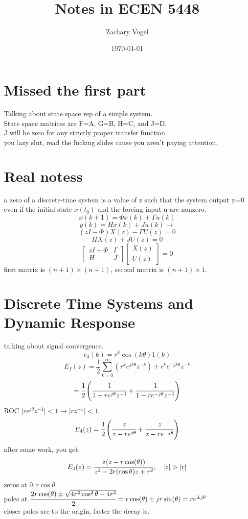 \documentclass{article}
\author{Zachary Vogel}
\date{\today}
\title{Notes in ECEN 5448}
\begin{document}
\maketitle


\section*{Missed the first part}
Talking about state space rep of a simple system.\\
State space matrices are F=A, G=B, H=C, and J=D.\\
J will be zero for any strictly proper transfer function.\\

you lazy slut, read the fucking slides cause you aren't paying attention.\\

\section*{Real notess}
a zero of a discrete-time system is a value of z such that the system output y=0 even if the initial state $x(t_0)$ and the forcing input u are nonzero.\\
\[x(k+1)=\Phi x(k)+\Gamma u(k)\]
\[y(k)=Hx(k)+Ju(k)\to\]
\[(zI-\Phi)X(z)-\Gamma U(z)=0\]
\[HX(z)+JU(z)=0\]
\[\begin{bmatrix}zI-\Phi&\Gamma\\H&J\end{bmatrix}\begin{bmatrix}X(z)\\U(z)\end{bmatrix}=0\]
first matrix is $(n+1)\times (n+1)$, second matrix is $(n+1)\times 1$.

\section*{Discrete Time Systems and Dynamic Response}
talking about signal convergence.\\

\[e_4(k)=r^k\cos(k\theta)1(k)\]
\[E_f(z)=\frac{1}{2}\sum_{k=0}^\infty (r^ke^{jk\theta}z^{-k})+r^ke^{-jk\theta}z^{-k}\]
\[=\cfrac{1}{2}\left (\cfrac{1}{1-re^{j\theta}z^{-1}}+\cfrac{1}{1-re^{-j\theta}z^{-1}}\right )\]
ROC $\lvert re^{j\theta}z^{-1}\rvert <1 \to \lvert rz^{-1}\rvert <1$.\\
\[E_4(z)=\cfrac{1}{2}\left (\cfrac{z}{z-re^{j\theta}}+\cfrac{z}{z-re^{-j\theta}}\right )\]
after some work, you get:
\[E_4(z)=\cfrac{z(z-r\cos(\theta))}{z^2-2r(\cos\theta)z+r^2}, \quad \lvert z\rvert >\lvert r\rvert\]
zeros at $0, r\cos \theta$.\\
poles at $\cfrac{2r\cos(\theta)\pm\sqrt{4r^2\cos^2\theta-4r^2}}{2}=r\cos(\theta)\pm jr\sin(\theta)=re^{\pm j\theta}$\\
closer poles are to the origin, faster the decay is.\\
\end{document}
